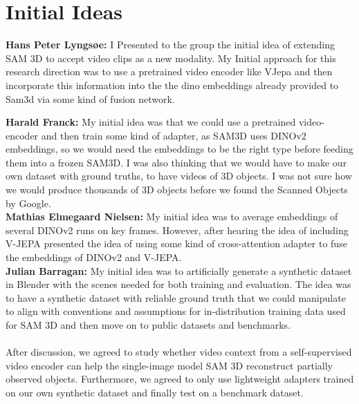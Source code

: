 \documentclass{article}
\begin{document}
\newpage
{}

\appendix


\onecolumn
\section{Initial Ideas}
\textbf{Hans Peter Lyngsøe:} I Presented to the group the initial idea of extending SAM 3D to accept video clips as a new modality. My Initial approach for this research direction was to use a pretrained video encoder like VJepa and then incorporate this information into the the dino embeddings already provided to Sam3d via some kind of fusion network.

\textbf{Harald Franck:} My initial idea was that we could use a pretrained video-encoder and then train some kind of adapter, as SAM3D uses DINOv2 embeddings, so we would need the embeddings to be the right type before feeding them into a frozen SAM3D. I was also thinking that we would have to make our own dataset with ground truths, to have videos of 3D objects. I was not sure how we would produce thousands of 3D objects before we found the Scanned Objects by Google.\\
\textbf{Mathias Elmegaard Nielsen:} My initial idea was to average embeddings of several DINOv2 runs on key frames. However, after hearing the idea of including V-JEPA presented the idea of using some kind of cross-attention adapter to fuse the embeddings of DINOv2 and V-JEPA.\\
\textbf{Julian Barragan:} My initial idea was to artificially generate a synthetic dataset in Blender with the scenes needed for both training and evaluation. The idea was to have a synthetic dataset with reliable ground truth that we could manipulate to align with conventions and assumptions for in-distribution training data used for SAM 3D and then move on to public datasets and benchmarks.
\\ \\
After discussion, we agreed to study whether video context from a self-supervised video encoder can help the single-image model SAM 3D reconstruct partially observed objects. Furthermore, we agreed to only use lightweight adapters trained on our own synthetic dataset and finally test on a benchmark dataset.
\end{document}
